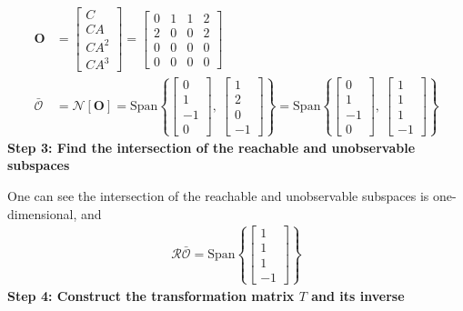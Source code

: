 \documentclass[twoside, 11pt, a4paper]{article}
\begin{document}
\begin{align*}
    \mathbf{O} &= \left[ \begin{array}{c} C \\ C A \\ C A^2 \\ C A^3 \end{array} \right] 
    =
    \left[ \begin{array}{cccc} 0 & 1 & 1 & 2 \\ 
    2 & 0 & 0 & 2 \\ 
    0 & 0 & 0 & 0 \\ 
    0 & 0 & 0 & 0 
    \end{array} \right] 
    \\
    \bar{\mathcal{O}} &= \mathcal{N}[ \mathbf{O} ] = \mathrm{Span} \left\lbrace 
    \left[ \begin{array}{c} 0 \\  1 \\  -1 \\  0  \end{array} \right] 
    , \
    \left[ \begin{array}{c} 1 \\  2 \\  0 \\  -1  \end{array} \right] 
    \right\rbrace = \mathrm{Span} \left\lbrace 
    \left[ \begin{array}{c} 0 \\  1 \\  -1 \\  0  \end{array} \right] 
    , \
    \left[ \begin{array}{c} 1 \\  1 \\  1 \\  -1  \end{array} \right] \right\rbrace 
\end{align*}
%
\textbf{Step 3: Find the intersection of the reachable and unobservable subspaces}

One can see the intersection of the reachable and unobservable subspaces 
is one-dimensional, and 
%
\begin{align*}
    \mathcal{R}\bar{\mathcal{O}} = \mathrm{Span} \left\lbrace 
    \left[ \begin{array}{c} 1 \\  1 \\  1 \\  -1  \end{array} \right] \right\rbrace 
\end{align*}
%
\textbf{Step 4: Construct the transformation matrix $T$ and its inverse}
\end{document}

